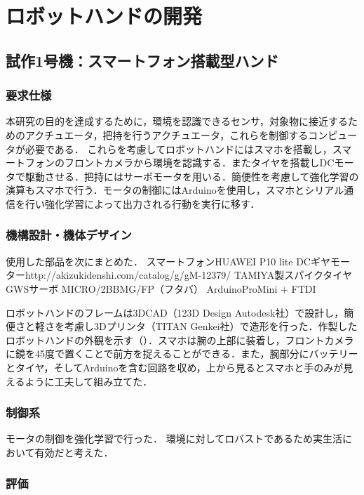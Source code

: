 \chapter{ロボットハンドの開発}
\label{chap_result}

\section{試作1号機：スマートフォン搭載型ハンド}

\subsection{要求仕様}
本研究の目的を達成するために，環境を認識できるセンサ，対象物に接近するためのアクチュエータ，把持を行うアクチュエータ，これらを制御するコンピュータが必要である．
これらを考慮してロボットハンドにはスマホを搭載し，スマートフォンのフロントカメラから環境を認識する．またタイヤを搭載しDCモータで駆動させる．把持にはサーボモータを用いる．簡便性を考慮して強化学習の演算もスマホで行う．モータの制御にはArduinoを使用し，スマホとシリアル通信を行い強化学習によって出力される行動を実行に移す．


\subsection{機構設計・機体デザイン}

使用した部品を次にまとめた．
スマートフォンHUAWEI P10 lite
DCギヤモーターhttp://akizukidenshi.com/catalog/g/gM-12379/
TAMIYA製スパイクタイヤ
GWSサーボ MICRO/2BBMG/FP（フタバ）
ArduinoProMini + FTDI


ロボットハンドのフレームは3DCAD（123D Design Autodesk社）で設計し，簡便さと軽さを考慮し3Dプリンタ（TITAN Genkei社）で造形を行った．作製したロボットハンドの外観を示す（\fig{}）．スマホは腕の上部に装着し，フロントカメラに鏡を45度で置くことで前方を捉えることができる．また，腕部分にバッテリーとタイヤ，そしてArduinoを含む回路を収め，上から見るとスマホと手のみが見えるように工夫して組み立てた．


\subsection{制御系}
モータの制御を強化学習で行った．
環境に対してロバストであるため実生活において有効だと考えた．


\subsection{評価}


